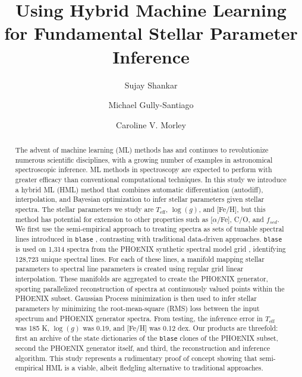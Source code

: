 \documentclass[twocolumn]{aastex631}
\begin{document}
\title{Using Hybrid Machine Learning for Fundamental Stellar Parameter Inference}
\author[0000-0002-2290-6810]{Sujay Shankar}
\author[0000-0002-4020-3457]{Michael Gully-Santiago}
\author[0000-0002-4404-0456]{Caroline V. Morley}


\begin{abstract}
    The advent of machine learning (ML) methods has and continues to revolutionize numerous scientific disciplines, with a growing number of examples in astronomical spectroscopic inference.
    ML methods in spectroscopy are expected to perform with greater efficacy than conventional computational techniques.
    In this study we introduce a hybrid ML (HML) method that combines automatic differentiation (autodiff), interpolation, and Bayesian optimization to infer stellar parameters given stellar spectra.
    The stellar parameters we study are $T_{\mathrm{eff}}$, $\log(g)$, and [Fe/H], but this method has potential for extension to other properties such as [$\alpha$/Fe], C/O, and $f_{sed}$.
    We first use the semi-empirical approach to treating spectra as sets of tunable spectral lines introduced in \texttt{blase} \citep{blase}, contrasting with traditional data-driven approaches. 
    \texttt{blase} is used on 1,314 spectra from the PHOENIX synthetic spectral model grid \citep{PHOENIX}, identifying 128,723 unique spectral lines.
    For each of these lines, a manifold mapping stellar parameters to spectral line parameters is created using regular grid linear interpolation.
    These manifolds are aggregated to create the PHOENIX generator, sporting parallelized reconstruction of spectra at continuously valued points within the PHOENIX subset.
    Gaussian Process minimization is then used to infer stellar parameters by minimizing the root-mean-square (RMS) loss between the input spectrum and PHOENIX generator spectra.
    From testing, the inference error in $T_{\mathrm{eff}}$ was 185 K, $\log(g)$ was 0.19, and [Fe/H] was 0.12 dex.
    Our products are threefold: first an archive of the state dictionaries of the \texttt{blase} clones of the PHOENIX subset, second the PHOENIX generator itself, and third, the reconstruction and inference algorithm.
    This study represents a rudimentary proof of concept showing that semi-empirical HML is a viable, albeit fledgling alternative to traditional approaches.
\end{abstract}
\end{document}
